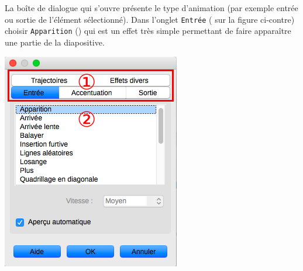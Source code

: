 \vspace{1em}

\begin{minipage}[c]{.58\textwidth}
La boîte de dialogue qui s'ouvre présente le type d'animation (par exemple entrée ou sortie de l'élément sélectionné). Dans l'onglet \texttt{Entrée} ( sur la figure ci-contre) choisir \texttt{Apparition} () qui est un effet très simple permettant de faire apparaître une partie de la diapositive.
\end{minipage}\hfill%
\begin{minipage}[c]{.38\textwidth}
\centering%
\includegraphics[angle=0,width=.7\textwidth]{./images/presentation/Impress_08_Transitions_03}
\end{minipage}


\vspace{1em}

